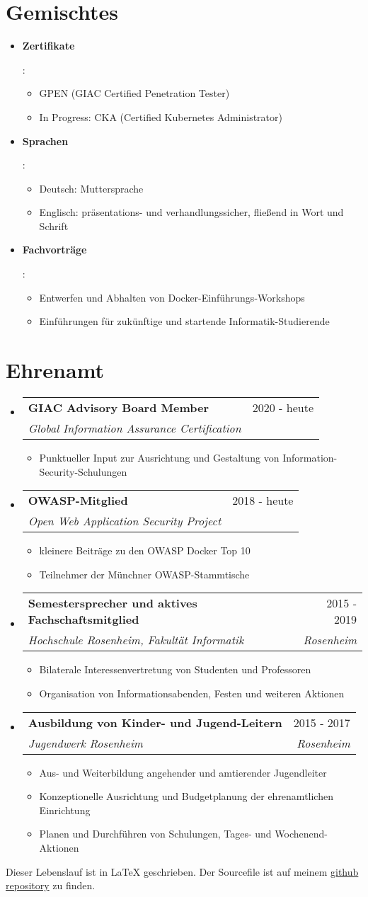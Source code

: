\documentclass[letterpaper,11pt]{article}
\makeatletter
\newcommand{\resumeItemWithoutHeadline}[1]{
	\item\small{
		{#1 \vspace{-2pt}}
	}
}
\newcommand{\resumeSubheading}[4]{
  \vspace{-1pt}\item
    \begin{tabular*}{0.97\textwidth}[t]{l@{\extracolsep{\fill}}r}
      \textbf{#1} & #2 \\
      \textit{\small#3} & \textit{\small #4} \\
    \end{tabular*}\vspace{-5pt}
}
\newcommand{\resumeSubHeadingListStart}{\begin{itemize}[leftmargin=*]}
\newcommand{\resumeSubHeadingListEnd}{\end{itemize}}
\newcommand{\resumeItemListStart}{\begin{itemize}}
\newcommand{\resumeItemListEnd}{\end{itemize}\vspace{-5pt}}
\makeatother
\begin{document}
\section{Gemischtes}
\resumeSubHeadingListStart
\item{
	\textbf{Zertifikate}{: 
		\resumeItemListStart
		\resumeItemWithoutHeadline
		{GPEN (GIAC Certified Penetration Tester)}
		\resumeItemWithoutHeadline
		{In Progress: CKA (Certified Kubernetes Administrator)}
		\resumeItemListEnd
}}
\item{
	\textbf{Sprachen}{: 	
		\resumeItemListStart
		\resumeItemWithoutHeadline
		{Deutsch: Muttersprache}
		\resumeItemWithoutHeadline
		{Englisch: präsentations- und verhandlungssicher, fließend in Wort und Schrift}
		\resumeItemListEnd
}}
\item{
	\textbf{Fachvorträge}{: 
		\resumeItemListStart
		\resumeItemWithoutHeadline
		{Entwerfen und Abhalten von Docker-Einführungs-Workshops}
		\resumeItemWithoutHeadline
		{Einführungen für zukünftige und startende Informatik-Studierende}
		\resumeItemListEnd
}}
\resumeSubHeadingListEnd

\section{Ehrenamt}
  \resumeSubHeadingListStart  
  	
  	\resumeSubheading
  	{GIAC Advisory Board Member}{2020 - heute}
  	{Global Information Assurance Certification}{}
  	\resumeItemListStart
  		\resumeItemWithoutHeadline
  		{Punktueller Input zur Ausrichtung und Gestaltung von Information-Security-Schulungen}
  	\resumeItemListEnd
  	
  	\resumeSubheading
  	{OWASP-Mitglied}{2018 - heute}
  	{Open Web Application Security Project}{}
  	\resumeItemListStart
  		\resumeItemWithoutHeadline
  		{kleinere Beiträge zu den OWASP Docker Top 10}
  		\resumeItemWithoutHeadline
  		{Teilnehmer der Münchner OWASP-Stammtische}
  	\resumeItemListEnd
  	  
	\resumeSubheading
	{Semestersprecher und aktives Fachschaftsmitglied}{2015 - 2019}
	{Hochschule Rosenheim, Fakultät Informatik}{Rosenheim}
	\resumeItemListStart
		\resumeItemWithoutHeadline
		{Bilaterale Interessenvertretung von Studenten und Professoren}
		\resumeItemWithoutHeadline
		{Organisation von Informationsabenden, Festen und weiteren Aktionen}
	\resumeItemListEnd
	
	\resumeSubheading
	{Ausbildung von Kinder- und Jugend-Leitern}{2015 - 2017}
	{Jugendwerk Rosenheim}{Rosenheim}
	\resumeItemListStart
		\resumeItemWithoutHeadline
		{Aus- und Weiterbildung angehender und amtierender Jugendleiter}
		\resumeItemWithoutHeadline
		{Konzeptionelle Ausrichtung und Budgetplanung der ehrenamtlichen Einrichtung}
		\resumeItemWithoutHeadline
		{Planen und Durchführen von Schulungen, Tages- und Wochenend-Aktionen}
	\resumeItemListEnd
	
  \resumeSubHeadingListEnd

\raggedleft 
\tiny{Dieser Lebenslauf ist in LaTeX geschrieben. Der Sourcefile ist auf meinem \href{https://github.com/gramsimamsi/resume/blob/master/lukas_grams_resume.tex}{github repository} zu finden. }
\end{document}
